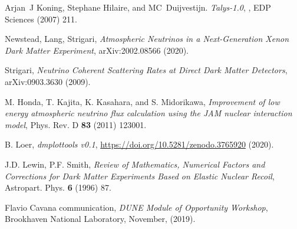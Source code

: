 \documentclass[a4paper,11pt]{article}
\begin{document}
\begin{thebibliography}{99}
Arjan~J Koning, Stephane Hilaire, and MC~Duijvestijn.
\newblock \emph{Talys-1.0},
, EDP Sciences (2007) 211.

Newstead, Lang, Strigari,
{\it Atmospheric Neutrinos in a Next-Generation Xenon Dark Matter Experiment}, arXiv:2002.08566 (2020).

Strigari,
{\it Neutrino Coherent Scattering Rates at Direct Dark Matter Detectors}, arXiv:0903.3630   (2009).

M. Honda, T. Kajita, K. Kasahara, and S. Midorikawa,
{\it Improvement of low energy atmospheric neutrino flux calculation using the JAM nuclear interaction model}, 
Phys. Rev. D {\bf 83} (2011) 123001.

B. Loer, {\it dmplottools v0.1}, \url{https://doi.org/10.5281/zenodo.3765920} (2020).


J.D. Lewin, P.F. Smith,
\emph {Review of Mathematics, Numerical Factors and Corrections for Dark Matter Experiments Based on Elastic Nuclear Recoil}, 
Astropart. Phys. {\bf 6} (1996) 87.


Flavio Cavana communication, \emph{DUNE Module of Opportunity Workshop}, Brookhaven National Laboratory, November, (2019).








\end{thebibliography}
\end{document}
